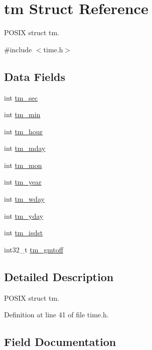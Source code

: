 \hypertarget{structtm}{}\section{tm Struct Reference}
\label{structtm}


P\+O\+S\+IX struct tm.  




{\ttfamily \#include $<$time.\+h$>$}

\subsection*{Data Fields}
\begin{DoxyCompactItemize}
\item 
int \hyperlink{structtm_a4d098a9a5c03a00b2ee61e10851de81e}{tm\+\_\+sec}
\item 
int \hyperlink{structtm_af414eb7c86cc3099595211eee4d4211b}{tm\+\_\+min}
\item 
int \hyperlink{structtm_a3e7ca4e37f1abcaf56b8a916c38eb9fe}{tm\+\_\+hour}
\item 
int \hyperlink{structtm_ab8d8904bad43b0c8b96e61941c5b5310}{tm\+\_\+mday}
\item 
int \hyperlink{structtm_a112ac36fa2f593777138a417cf031e17}{tm\+\_\+mon}
\item 
int \hyperlink{structtm_a33adf78fd6476b2120ce3b9c4a852053}{tm\+\_\+year}
\item 
int \hyperlink{structtm_afe81a8c46f1c693c43f259b288859f4f}{tm\+\_\+wday}
\item 
int \hyperlink{structtm_a93a0ba77cc23796df84405dcbcc57eb1}{tm\+\_\+yday}
\item 
int \hyperlink{structtm_a5645ca0580c8ab2c24f6c2965d9c9f9c}{tm\+\_\+isdst}
\item 
int32\+\_\+t \hyperlink{structtm_a6b7d1fb16f21197ea027e364e2812c3d}{tm\+\_\+gmtoff}
\end{DoxyCompactItemize}


\subsection{Detailed Description}
P\+O\+S\+IX struct tm. 

Definition at line 41 of file time.\+h.



\subsection{Field Documentation}
